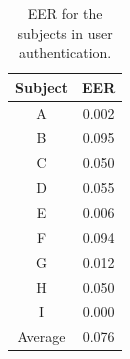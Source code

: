 \documentclass[sigchi,authordraft]{acmart}
\newcommand\figref[1]{\textbf{Figure~\ref{fig:#1}}}
\newcommand\tabref[1]{\textbf{Table~\ref{tab:#1}}}
\begin{document}
\begin{table}[!t]
  \centering
  \caption{EER for the subjects in user authentication.}
  \begin{tabular}{c|c} \hline\hline
    Subject & EER \\ \hline
    A & 0.002 \\
    B & 0.095 \\
    C & 0.050 \\
    D & 0.055 \\
    E & 0.006 \\
    F & 0.094 \\
    G & 0.012 \\
    H & 0.050 \\
    I & 0.000 \\ \hline
    Average & 0.076 \\ \hline
  \end{tabular}
  \label{tab:EER_num}
\end{table}




\end{document}
